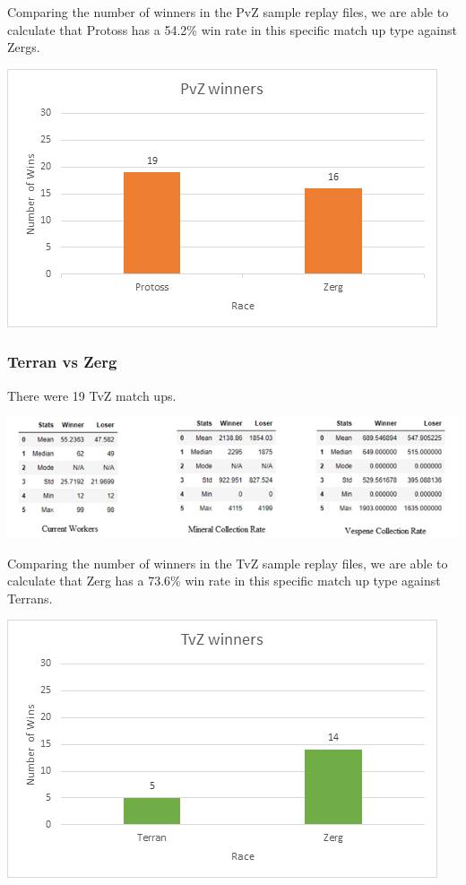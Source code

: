 \documentclass[a4paper,12pt]{report}
\begin{document}
Comparing the number of winners in the PvZ sample replay files, we are able to calculate that Protoss has a 54.2\% win rate in this specific match up type against Zergs.

\begin{center}
    \captionsetup{type=figure}
    \includegraphics[width=.9\linewidth]{media/PvZwinners.png}
\end{center}

\subsubsection{Terran vs Zerg}
There were 19 TvZ match ups.

\begin{center}
    \captionsetup{type=figure}
    \includegraphics[width=.9\linewidth]{media/WorkersCollectionTvZ.png}
\end{center}

Comparing the number of winners in the TvZ sample replay files, we are able to calculate that Zerg has a 73.6\% win rate in this specific match up type against Terrans.

\begin{center}
    \captionsetup{type=figure}
    \includegraphics[width=.9\linewidth]{media/TvZwinrate.png}
\end{center}
\end{document}
